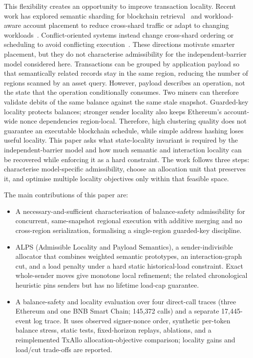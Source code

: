 \documentclass[runningheads]{llncs}
\begin{document}
This flexibility creates an opportunity to improve transaction locality. Recent work has explored semantic sharding for blockchain retrieval~\cite{zhen2024semantichain} and workload-aware account placement to reduce cross-shard traffic or adapt to changing workloads~\cite{txallo2023,wang2024orbit,zhang2025mosaic}. Conflict-oriented systems instead change cross-shard ordering or scheduling to avoid conflicting execution~\cite{hong2023prophet,liu2026concordia}. These directions motivate smarter placement, but they do not characterise admissibility for the independent-barrier model considered here. Transactions can be grouped by application payload so that semantically related records stay in the same region, reducing the number of regions scanned by an asset query. However, payload describes an operation, not the state that the operation conditionally consumes. Two miners can therefore validate debits of the same balance against the same stale snapshot. Guarded-key locality protects balances; stronger sender locality also keeps Ethereum's account-wide nonce dependencies region-local. Therefore, high clustering quality does not guarantee an executable blockchain schedule, while simple address hashing loses useful locality. This paper asks what state-locality invariant is required by the independent-barrier model and how much semantic and interaction locality can be recovered while enforcing it as a hard constraint. The work follows three steps: characterise model-specific admissibility, choose an allocation unit that preserves it, and optimise multiple locality objectives only within that feasible space.

The main contributions of this paper are:

\begin{itemize}
\item A necessary-and-sufficient characterisation of balance-safety admissibility for concurrent, same-snapshot regional execution with additive merging and no cross-region serialization, formalising a single-region guarded-key discipline.

\item ALPS (Admissible Locality and Payload Semantics), a sender-indivisible allocator that combines weighted semantic prototypes, an interaction-graph cut, and a load penalty under a hard static historical-load constraint. Exact whole-sender moves give monotone local refinement; the related chronological heuristic pins senders but has no lifetime load-cap guarantee.

\item A balance-safety and locality evaluation over four direct-call traces (three Ethereum and one BNB Smart Chain; 145,372 calls) and a separate 17,445-event log trace. It uses observed signer-nonce order, synthetic per-token balance stress, static tests, fixed-horizon replays, ablations, and a reimplemented TxAllo allocation-objective comparison; locality gains and load/cut trade-offs are reported.
\end{itemize}
\end{document}
